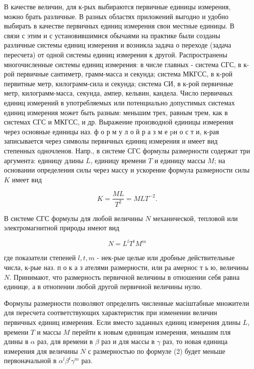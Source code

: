 \documentclass[10pt]{article}
\begin{document}
В качестве величин, для к-рых выбираются первичные единицы измерения, можно брать различные. В разных областях приложений выгодно и удобно выбирать в качестве первичных единиц измерения свои местные единицы. В связи с этим и с установившимися обычаями на практике были созданы различные системы единиц измерения и возникла задача о переходе (задача пересчета) от одной системы единиц измерения к другой. Распространены многочисленные системы единиц измерения: в числе главных - система СГС, в к-рой первичные сантиметр, грамм-масса и секунда; система МКГСС, в к-рой первитные метр, килограмм-сила и секунда; система СИ, в к-рой первичные метр, килограмм-масса, секунда, ампер, кельвин, кандела. Число первичных единиц измерений в употребляемых или потенциально допустимых системах единиц измерения может быть разным: меньшим трех, равным трем, как в системах СГС и МКГСС, и др. Выражение производной единицы измерения через основные единицы наз. ф о р м у л о й р а з м е pн о с т и, к-рая записывается через символы первичных единиц измерения и имеет вид степенных одночленов. Напр., в системе СГС формулы размерности содержат три аргумента: единицу длины $L$, единицу времени $T$ и единицу массы $M$; на основании определения силы через массу и ускорение формула размерности силы $K$ имеет вид



\[

K=\frac{M L}{T^{2}}=M L T^{-2} .

\]



В системе СГС формулы для любой величины $N$ механической, тепловой или электромагнитной природы имеют вид



\[

N=L^{l} T^{t} M^{m}

\]



где показатели степеней $l, t, m$ - нек-рые целые или дробные действительные числа, к-рые наз. п о к а з ателями размерности, или ра амернос т ь ю, величины $N$. Принимают, что размерность первичной величины в отношении себя равна единице, а в отнопении любой другой первичной величины нулю.



Формулы размерности позволяют определить численные масіштабные множители для пересчета соответствующих характеристик при изменении величин первичных единиц измерения. Если вместо заданных единиц измерения длины $L$, времени $T$ и массы $M$ перейти к новым единицам измерения, меньшим пля длины в $\alpha$ раз, для времени в $\beta$ раз и для массы в $\gamma$ раз, то новая единица измерения для величины $N$ с размерностью по формуле (2) будет меньше первоначальной в $\alpha^{l} \beta^{t} \gamma^{m}$ раз.
\end{document}
